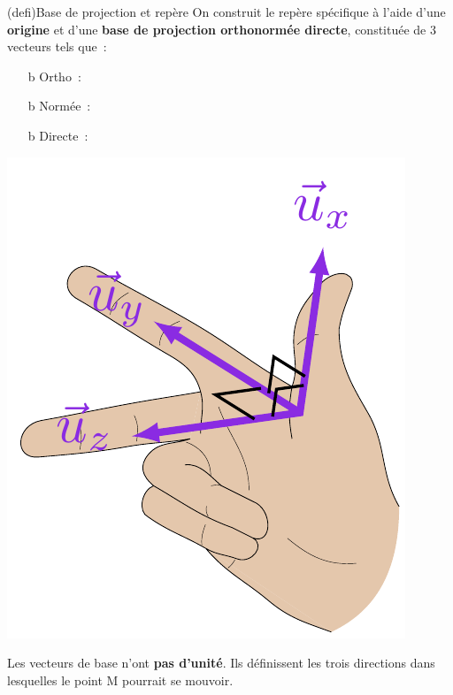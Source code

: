 \documentclass[../../main/main.tex]{subfiles}
\begin{document}
\begin{tcb*}(defi){Base de projection et repère}
	On construit le repère spécifique à l'aide d'une \textbf{origine} et d'une
	\textbf{base de projection orthonormée directe}, constituée de 3
	vecteurs tels que~:
	\smallbreak
	\begin{isd}[righthand ratio=.20]
		\begin{itemize}
			\item[b]{Ortho}~: 
			\item[b]{Normée}~: %
			\item[b]{Directe}~: %
		\end{itemize}
		\tcblower
		\begin{center}
			\includegraphics[width=.8\linewidth]{righthand}
		\end{center}
	\end{isd}
	Les vecteurs de base n'ont \textbf{pas d'unité}. Ils définissent les trois
	directions dans lesquelles le point M pourrait se mouvoir.
\end{tcb*}
\end{document}
